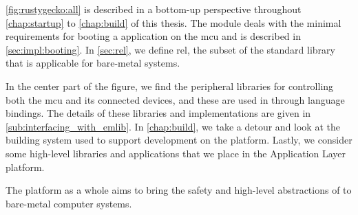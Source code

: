 \autoref{fig:rustygecko:all} is described in a bottom-up perspective throughout \autoref{chap:startup} to \autoref{chap:build} of this thesis.
The  module deals with the minimal requirements for booting a {\rust} application on the \gls{mcu} and is described in \autoref{sec:impl:booting}.
In \autoref{sec:rel}, we define \gls{rel}, the subset of the {\rust} standard library that is applicable for bare-metal systems.

In the center part of the figure, we find the peripheral libraries for controlling both the \gls{mcu} and its connected devices, and these are used in {\rust} through language bindings.
The details of these libraries and implementations are given in \autoref{sub:interfacing_with_emlib}.
In \autoref{chap:build}, we take a detour and look at the building system used to support development on the {\rg} platform.
Lastly, we consider some high-level libraries and applications that we place in the Application Layer platform.

The {\rg} platform as a whole aims to bring the safety and high-level abstractions of {\rust} to bare-metal computer systems.
